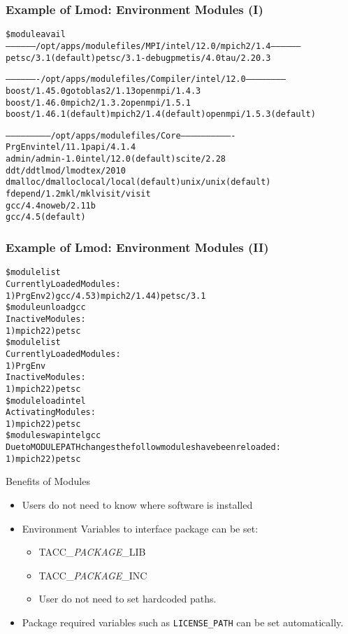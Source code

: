 \documentclass{beamer}
\begin{document}
\begin{frame}[fragile]
    \frametitle{Example of Lmod: Environment Modules (I)}
    {\tiny
\begin{alltt}
\$ {\color{blue} module avail}
------------------ /opt/apps/modulefiles/MPI/intel/12.0/mpich2/1.4 ------------------
  petsc/3.1 (default)    petsc/3.1-debug    pmetis/4.0    tau/2.20.3  

------------------- /opt/apps/modulefiles/Compiler/intel/12.0 -----------------------
  boost/1.45.0              gotoblas2/1.13          openmpi/1.4.3  
  boost/1.46.0              mpich2/1.3.2            openmpi/1.5.1  
  boost/1.46.1 (default)    mpich2/1.4 (default)    openmpi/1.5.3 (default)  

-------------------------- /opt/apps/modulefiles/Core -------------------------------
  PrgEnv               intel/11.1               papi/4.1.4  
  admin/admin-1.0      intel/12.0 (default)     scite/2.28
  ddt/ddt              lmod/lmod                tex/2010  
  dmalloc/dmalloc      local/local (default)    unix/unix (default)                       
  fdepend/1.2          mkl/mkl                  visit/visit  
  gcc/4.4              noweb/2.11b             
  gcc/4.5 (default)                     
\end{alltt}
    }
\end{frame}

\begin{frame}[fragile]
    \frametitle{Example of Lmod: Environment Modules (II)}
    {\tiny
\begin{alltt}
{\color{blue}\$ module list}
Currently Loaded Modules:
  1) PrgEnv  2) gcc/4.5  3) mpich2/1.4  4) petsc/3.1
{\color{blue}\$ module unload gcc}
Inactive Modules:
  1) mpich2  2) petsc
{\color{blue}\$ module list}
Currently Loaded Modules:
  1) PrgEnv
Inactive Modules:
  1) mpich2  2) petsc
{\color{blue}\$ module load intel}
Activating Modules:
  1) mpich2  2) petsc
{\color{blue}\$ module swap intel gcc}
Due to MODULEPATH changes the follow modules have been reloaded:
  1) mpich2  2) petsc
\end{alltt}
    }
\end{frame}


\begin{frame}{Benefits of Modules}
  \begin{itemize}
    \item Users do not need to know where software is installed
    \item Environment Variables to interface package can be set:
      \begin{itemize}
        \item TACC\_{\color{blue}\emph{PACKAGE}}\_LIB
        \item TACC\_{\color{blue}\emph{PACKAGE}}\_INC
        \item User do not need to set hardcoded paths.
      \end{itemize}
    \item Package required variables such as \texttt{LICENSE\_PATH}
      can be set automatically.
  \end{itemize}
\end{frame}
\end{document}
